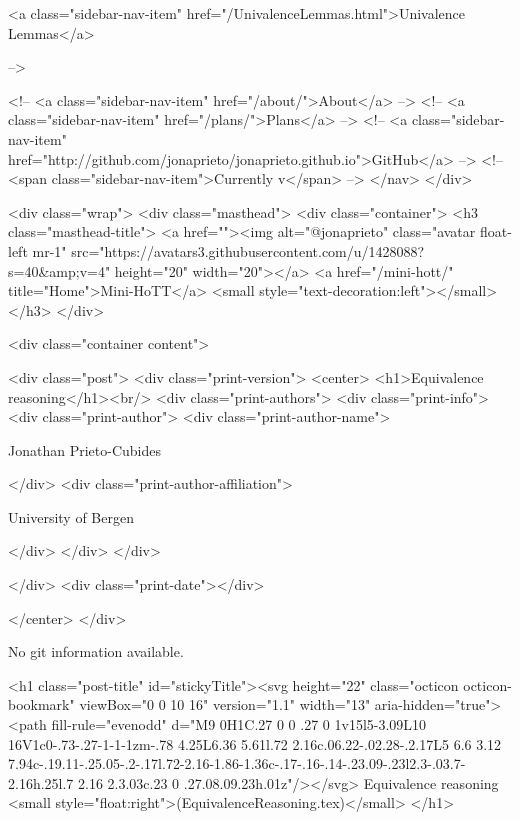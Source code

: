       
    
      
        
          <a class="sidebar-nav-item" href="/UnivalenceLemmas.html">Univalence Lemmas</a>
        
      
     -->

    <!-- <a class="sidebar-nav-item" href="/about/">About</a> -->
    <!-- <a class="sidebar-nav-item" href="/plans/">Plans</a> -->
    <!-- <a class="sidebar-nav-item" href="http://github.com/jonaprieto/jonaprieto.github.io">GitHub</a> -->
    <!-- <span class="sidebar-nav-item">Currently v</span> -->
  </nav>
</div>

    <div class="wrap">
      <div class="masthead">
        <div class="container">
          <h3 class="masthead-title">
            <a href=""><img alt="@jonaprieto" class="avatar float-left mr-1" src="https://avatars3.githubusercontent.com/u/1428088?s=40&amp;v=4" height="20" width="20"></a>
            <a href="/mini-hott/" title="Home">Mini-HoTT</a>
            <small style="text-decoration:left"></small>
          </h3>
        </div>
      
      <div class="container content">
        







<div class="post">
  <div class="print-version">
    <center>
      <h1>Equivalence reasoning</h1><br/>
        <div class="print-authors">
          <div class="print-info">
            <div class="print-author">
              <div class="print-author-name">
                
                  Jonathan Prieto-Cubides
                
              </div>
              <div class="print-author-affiliation">
                
                  University of Bergen
                
                </div>
            </div>
          </div>
          
          
        </div>
        <div class="print-date"></div>
        
        
    </center>
  </div>

  
  No git information available.
  

  <h1 class="post-title" id="stickyTitle"><svg height="22" class="octicon octicon-bookmark" viewBox="0 0 10 16" version="1.1" width="13" aria-hidden="true"><path fill-rule="evenodd" d="M9 0H1C.27 0 0 .27 0 1v15l5-3.09L10 16V1c0-.73-.27-1-1-1zm-.78 4.25L6.36 5.61l.72 2.16c.06.22-.02.28-.2.17L5 6.6 3.12 7.94c-.19.11-.25.05-.2-.17l.72-2.16-1.86-1.36c-.17-.16-.14-.23.09-.23l2.3-.03.7-2.16h.25l.7 2.16 2.3.03c.23 0 .27.08.09.23h.01z"/></svg> Equivalence reasoning <small style="float:right">(EquivalenceReasoning.tex)</small>
  </h1>


